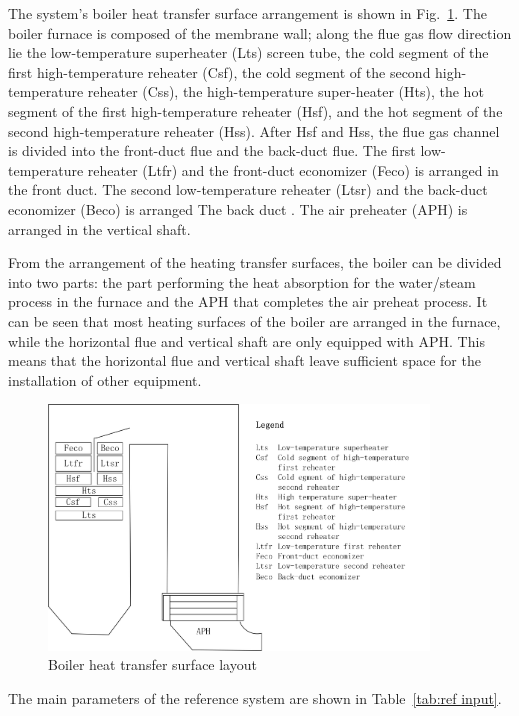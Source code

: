 \documentclass[preprint,12pt]{elsarticle}
\begin{document}
The system's boiler heat transfer surface arrangement is shown in Fig.~\ref{fig:boiler_surface}. 
The boiler furnace is composed of the membrane wall; along the flue gas flow direction lie the low-temperature superheater (Lts) screen tube, the cold segment of the first high-temperature reheater (Csf), the cold segment of the second high-temperature reheater (Css), the high-temperature super-heater (Hts), the hot segment of the first high-temperature reheater (Hsf), and the hot segment of the second high-temperature reheater (Hss).
After Hsf and Hss, the flue gas channel is divided into the front-duct flue and the back-duct flue.
The first low-temperature reheater (Ltfr) and the front-duct economizer (Feco) is arranged in the front duct.
The second low-temperature reheater (Ltsr) and the back-duct economizer (Beco) is arranged The back duct .
The air preheater (APH) is arranged in the vertical shaft.

From the arrangement of the heating transfer surfaces, the boiler can be divided into two parts: the part performing the heat absorption for the water/steam process in the furnace and the APH that completes the air preheat process.
It can be seen that most heating surfaces of the boiler are arranged in the furnace, while the horizontal flue and vertical shaft are only equipped with APH.
This means that the horizontal flue and vertical shaft leave sufficient space for the installation of other equipment.

\begin{figure}[htbp]
\centering
\includegraphics[width=0.9\textwidth]{fig/boiler_surface.png}
\caption{Boiler heat transfer surface layout} 
\label{fig:boiler_surface}
\end{figure}


The main parameters of the reference system are shown in Table~\ref{tab:ref input}.
\end{document}
